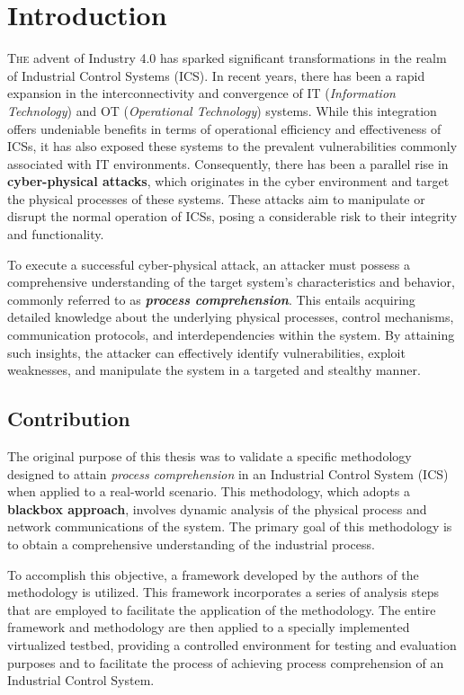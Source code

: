 \chapter{Introduction}
\label{intro}
\linenumbers

\lettrine[lines=2]{T}{he} advent of Industry 4.0 has sparked significant transformations in the realm of Industrial Control Systems (ICS). In recent years, there has been a rapid expansion in the interconnectivity and convergence of IT (\textit{Information Technology}) and OT (\textit{Operational Technology}) systems. While this integration offers undeniable benefits in terms of operational efficiency and effectiveness of ICSs, it has also exposed these systems to the prevalent vulnerabilities commonly associated with IT environments. Consequently, there has been a parallel rise in \textbf{cyber-physical attacks}, which originates in the cyber environment and target the physical processes of these systems. These attacks aim to manipulate or disrupt the normal operation of ICSs, posing a considerable risk to their integrity and functionality.

\bigskip
To execute a successful cyber-physical attack, an attacker must possess a comprehensive understanding of the target system's characteristics and behavior, commonly referred to as \textbf{\textit{process comprehension}}. This entails acquiring detailed knowledge about the underlying physical processes, control mechanisms, communication protocols, and interdependencies within the system. By attaining such insights, the attacker can effectively identify vulnerabilities, exploit weaknesses, and manipulate the system in a targeted and stealthy manner.

\vfill

\section{Contribution}
\label{sec:1_contribution}

The original purpose of this thesis was to validate a specific methodology designed to attain \textit{process comprehension} in an Industrial Control System (ICS) when applied to a real-world scenario. This methodology, which adopts a \textbf{blackbox approach}, involves dynamic analysis of the physical process and network communications of the system. The primary goal of this methodology is to obtain a comprehensive understanding of the industrial process.

\bigskip
To accomplish this objective, a framework developed by the authors of the methodology is utilized. This framework incorporates a series of analysis steps that are employed to facilitate the application of the methodology. The entire framework and methodology are then applied to a specially implemented virtualized testbed, providing a controlled environment for testing and evaluation purposes and to facilitate the process of achieving process comprehension of an Industrial Control System.

